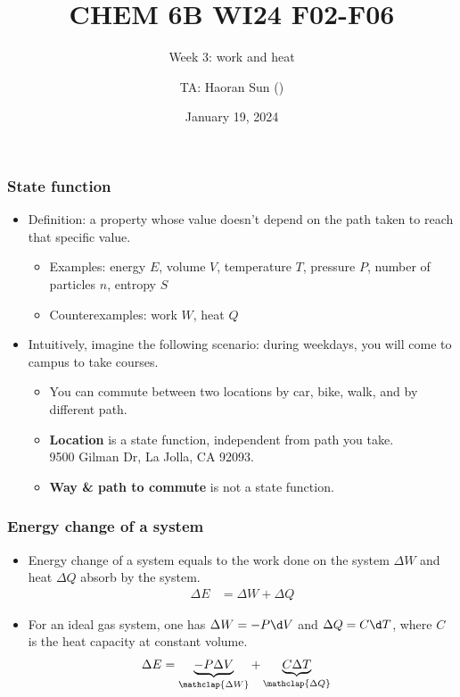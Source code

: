 \documentclass[aspectratio=169,xcolor={dvipsnames}]{beamer}
\title{CHEM 6B WI24 F02-F06}
\subtitle{Week 3: work and heat}
\author{TA: Haoran Sun (\href{mailto:\mail}{\mail})}
\institute{University of California, San Diego}
\date{January 19, 2024}
\begin{document}
\maketitle


\begin{frame}[t]
    \frametitle{State function}
    \begin{itemize}
        \item Definition: a property whose value doesn't depend on the path taken 
            to reach that specific value.
            \begin{itemize}
                \item Examples: energy $E$, volume $V$, temperature $T$, pressure $P$,
                    number of particles $n$, {\color{gray} entropy $S$}
                \item Counterexamples: work $W$, heat $Q$
            \end{itemize}

        \item<2> Intuitively, imagine the following scenario: during weekdays, 
            you will come to campus to take courses.
            \begin{itemize}
                \item You can commute between two locations by car, bike, walk,
                    and by different path. 
                \item \textbf{Location} is a state function, independent from path you take.\\
                    9500 Gilman Dr, La Jolla, CA 92093.
                \item \textbf{Way \& path to commute} is not a state function.
            \end{itemize}
    \end{itemize}
\end{frame}

\begin{frame}[t]
    \frametitle{Energy change of a system}
    \begin{itemize}
        \item Energy change of a system equals to 
            the work done on the system $\Delta W$ and heat $\Delta Q$ absorb
            by the system.
            \begin{align}
                \Delta E &= \Delta W + \Delta Q
            \end{align}
        \item For an ideal gas system, one has $\Delta W = -P\d V$
            and $\Delta Q = C\d T$, where $C$ is the heat capacity {\color{gray}
            at constant volume.}
            \begin{align}
                \Delta E &= \underbrace{-P\Delta V}_{\mathclap{\Delta W}} + 
                    \underbrace{C\Delta T}_{\mathclap{\Delta Q}}
            \end{align}
    \end{itemize}
\end{frame}
\end{document}

